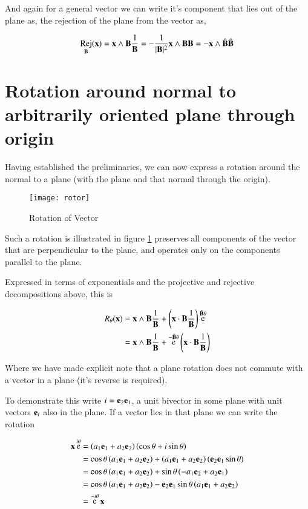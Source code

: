 \documentclass{article}      %
\DeclareMathOperator{\Rej}{Rej}
\DeclareMathOperator{\Exp}{e}
\begin{document}
And again for a general vector we can write it's component that lies out
of the plane as, the rejection of the plane from the vector as,

\[
\Rej_{\BB}(\Bx) 
= \Bx \wedge \BB \inv{\BB}
= -\inv{\abs{\BB}^2} \Bx \wedge \BB {\BB}
= -\Bx \wedge \hat{\BB} \hat{\BB}
\]

\section{ Rotation around normal to arbitrarily oriented plane through origin }

Having established the preliminaries, we can now express a rotation around
the normal to a plane (with the plane and that normal through the origin).

\begin{figure}[htp]
\centering
\texttt{[image: rotor]}
\caption{Rotation of Vector}\label{fig:rotor}
\end{figure}

Such a rotation is illustrated in figure \ref{fig:rotor}
preserves all components of the vector that are perpendicular
to the plane, and operates only on the components parallel to the plane.

Expressed in terms of exponentials and the projective and rejective decompositions above, this is

\begin{align*}
R_\theta(\Bx) 
&= \Bx \wedge \BB \inv{\BB} + \left(\Bx \cdot \BB \inv{\BB}\right)\Exp^{\hat{\BB}\theta} \\
&= \Bx \wedge \BB \inv{\BB} + \Exp^{-\hat{\BB}\theta}\left(\Bx \cdot \BB \inv{\BB}\right) \\
\end{align*}

Where we have made explicit note that a plane rotation does not commute with a vector in a plane (it's reverse is required).

To demonstrate this write $i = \mathbf{e}_2 \mathbf{e}_1$, a unit bivector in some plane with unit vectors $\mathbf{e}_i$ also in the plane.  If a vector
lies in that plane we can write the rotation 

\begin{align*}
\Bx \Exp^{i\theta} 
&= \left(a_1\Be_1 + a_2\Be_2\right)\left(\cos\theta + i\sin\theta\right) \\
&= \cos\theta\left(a_1\Be_1 + a_2\Be_2\right) + \left(a_1\Be_1 + a_2\Be_2\right)\left(\Be_2 \Be_1\sin\theta\right) \\
&= \cos\theta\left(a_1\Be_1 + a_2\Be_2\right) + \sin\theta \left(-a_1\Be_2 + a_2\Be_1\right) \\
&= \cos\theta\left(a_1\Be_1 + a_2\Be_2\right) -\Be_2 \Be_1\sin\theta \left(a_1\Be_1 + a_2\Be_2\right) \\
&= \Exp^{-i\theta}\Bx \\
\end{align*}
\end{document}
